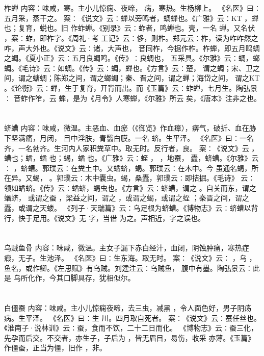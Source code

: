 \documentclass[12pt,UTF8]{ctexbook}
\begin{document}
\section{}柞蝉
内容：味咸，寒。主小儿惊痫、夜啼， 病，寒热。生杨柳上。 
《名医》曰∶五月采，蒸干之。 
案∶《说文》云∶蝉以旁鸣者，蜩蝉也。《广雅》云∶KT ，蝉也；复育，蜕也。旧 
作蚱蝉。《别录》云∶蚱者，鸣蝉也。壳，一名 蝉。又名伏 ，案∶蚱，即柞字。《周礼·考 
工记》云∶侈，则柞。郑元云∶柞，读为咋咋然之咋，声大外也。《说文》云∶诸，大声也， 
音同柞，今据作柞。柞蝉，即五月鸣蜩之蜩。《夏小正》云∶五月良蜩鸣。《传》∶良蜩也， 
五采具。《尔雅》云∶蜩，螂蜩。《毛诗》云∶如蜩。《传》云∶蜩，蝉也。《方言》云∶楚， 
谓之蜩；宋、卫之间，谓之螗蜩；陈郑之间，谓之螂蜩；秦、晋之间，谓之蝉；海岱之间， 
谓之KT 。《论衡》云∶蝉，生于复育，开背而出。而《玉篇》云∶蚱蝉，七月生。陶弘景∶ 
音蚱作笮，云 蝉，是为《月令》人寒蝉，《尔雅》所云 矣，《唐本》注非之也。 


\section{}蛴螬
内容：味咸，微温。主恶血、血瘀（《御览》作血瘴），痹气，破折、血在胁下坚满痛，月闭， 
目中淫肤，青翳白膜。一名 蛴。生平泽。 
《名医》曰∶一名 齐，一名勃齐。生河内人家积粪草中。取无时。反行者，良。 
案∶《说文》云 ， 螬也；蝤，蝤 也；蝎，蝤 也。《广雅》云∶蛭 ， ，地蚕， 
蠹，蛴螬。《尔雅》云∶ ，蛴螬。郭璞云∶在粪土中。又蝤蛴，蝎。郭璞云∶在木中。今 
虽通名蝎，所在异。又蝎， 。郭璞云∶木中囊虫。蝎，桑蠹，郭璞云∶即拮掘。《毛诗》 
云∶领如蝤蛴。《传》云∶蝤蛴，蝎虫也。《方言》云∶蛴螬，谓之 。自关而东，谓之蝤蛴， 
或谓之蚕 ，梁益之间，谓之 ，或谓之蝎，或谓之蛭 ；秦晋之间，谓之蠹，或谓之天蝼。 
《列子·天瑞篇》云∶乌足根为蛴螬。《博物志》云∶蛴螬以背行，快于足用。《说文》无 
字，当借 为之。声相近，字之误也。 


\section{}乌贼鱼骨
内容：味咸，微温。主女子漏下赤白经汁，血闭，阴蚀肿痛，寒热症瘕，无子。生池泽。 
《名医》曰∶生东海。取无时。 
案∶《说文》云∶ ，乌 ，鱼名，或作鲫。《左思赋》有乌贼。刘逵注云∶乌贼鱼， 
腹中有墨。陶弘景云∶此是 乌所化作，今其口脚具存，犹相似尔。 


\section{}白僵蚕
内容：味咸。主小儿惊痫夜啼，去三虫，减黑 ，令人面色好，男子阴疡病。生平泽。 
《名医》曰∶生 川。四月取自死者。 
案∶《说文》云∶蚕任丝也。《淮南子·说林训》云∶蚕，食而不饮，二十二日而化。 
《博物志》云∶蚕三化，先孕而后交。不交者，亦生子，子后为 ，皆无眉目，易伤，收采 
亦薄。《玉篇》作僵蚕，正当为僵，旧作 ，非。 
\end{document}
